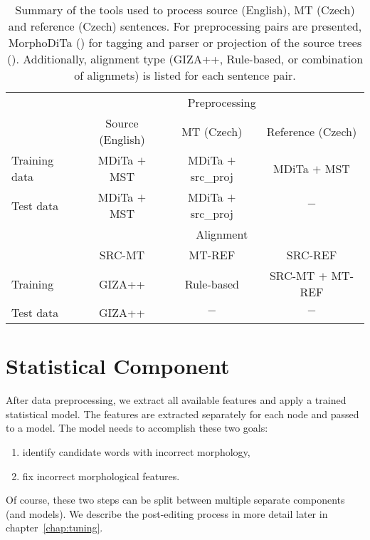 \begin{table*}[t]
\centering
\small

\begin{threeparttable}
\begin{tabular}{|l|c|c|c|}
\hline
\multirow{2}{*}{}  &  \multicolumn{3}{c|}{Preprocessing}  \\
\cline{2-4}
&  Source (English)  &  MT (Czech)  & Reference (Czech)  \\
\hline
Training data &  MDiTa $+$ MST  & MDiTa $+$ src\_proj &  MDiTa $+$ MST  \\
\hline
Test data &  MDiTa $+$ MST  &  MDiTa $+$ src\_proj  & $-$ \\
\hline
\hline
\multirow{2}{*}{}  &  \multicolumn{3}{c|}{Alignment} \\
\cline{2-4}
& SRC-MT & MT-REF & SRC-REF \\
\hline
Training  & GIZA++ & Rule-based & SRC-MT $+$ MT-REF \\
Test data  & GIZA++ & $-$ & $-$ \\
\hline
\end{tabular}
\end{threeparttable}
\caption[Summary of the main tools used for processing English and Czech sentences]{
Summary of the tools used to process source (English), MT (Czech) and reference (Czech) sentences. For preprocessing
 pairs are presented, MorphoDiTa () for tagging and  parser or projection of the source
trees (). Additionally, alignment type (GIZA++, Rule-based, or combination of alignmets) is listed
for each sentence pair.
}
\label{summary-analysis}
\end{table*}


\section{Statistical Component}

After data preprocessing, we extract all available features and
apply a trained statistical model. The features are extracted separately for each node and passed
to a model. The model needs to accomplish these two goals:
\begin{enumerate}
    \item identify candidate words with incorrect morphology,
    \item fix incorrect morphological features.
\end{enumerate}
Of course, these two steps can be split between multiple separate components (and models).
We describe the post-editing process in more detail later in chapter~\ref{chap:tuning}.

